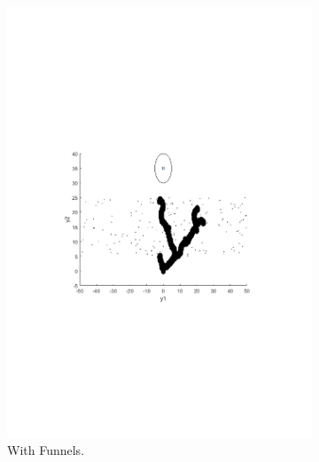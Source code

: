\begin{figure}[!t]
  \centering
  \begin{subfigure}[b]{\columnwidth}
  \centering
  \includegraphics[scale=.6, trim={4.5cm, 9cm, 5cm, 7cm}, clip]{figures/experiments/rrtfunnel-101samples.pdf}
  \caption{With Funnels.}
  \end{subfigure}
  \begin{subfigure}[b]{\columnwidth}
  \centering

\end{subfigure}
\end{figure}

